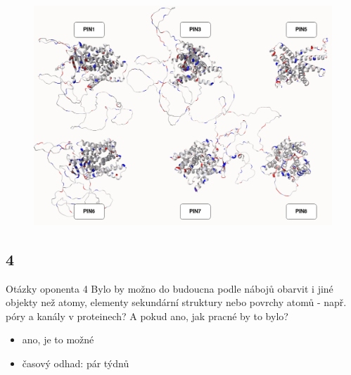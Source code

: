 \documentclass[
]{beamer}
\begin{document}
\begin{frame}
  \begin{figure}
    \includegraphics[width=1\textwidth,height=\textheight,keepaspectratio]{images/pins2.png}
  \end{figure}
\end{frame}

\subsection[4]{4}

\begin{frame}
  \begin{block}{Otázky oponenta 4}
    Bylo by možno do budoucna podle nábojů obarvit i jiné objekty než atomy, elementy sekundární struktury nebo povrchy atomů - např. póry a kanály v proteinech? A pokud ano, jak pracné by to bylo?
  \end{block}
  \begin{itemize}
    \item ano, je to možné
    \item časový odhad: pár týdnů
  \end{itemize}
\end{frame}
\end{document}
